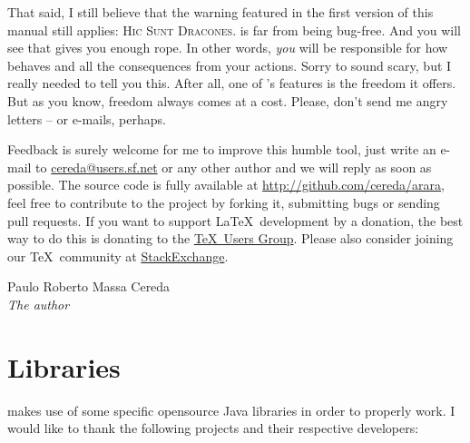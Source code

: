 \documentclass[a4paper,twoside,12pt]{memoir}
\begin{document}
That said, I still believe that the warning featured in the first version of this manual still applies: \textsc{Hic Sunt Dracones}. \arara is far from being bug-free. And you will see that \arara gives you enough rope. In other words, \emph{you} will be responsible for how \arara behaves and all the consequences from your actions. Sorry to sound scary, but I really needed to tell you this. After all, one of \arara's features is the freedom it offers. But as you know, freedom always comes at a cost. Please, don't send me angry letters -- or e-mails, perhaps.

Feedback is surely welcome for me to improve this humble tool, just write an 
e-mail to \url{cereda@users.sf.net} or any other author and we will reply as soon as possible. The source code is fully available at \url{http://github.com/cereda/arara}, feel free to contribute to the project by forking it, submitting bugs or sending pull requests. If you want to support \LaTeX\ development by a donation, the best way to do this is donating to the \href{http://www.tug.org/}{\TeX\ Users Group}. Please also  consider joining our \TeX\ community at \href{http://tex.stackexchange.com}{StackExchange}.

\vfill

\begin{flushright}
Paulo Roberto Massa Cereda\\
\emph{The author}
\end{flushright}

\cleardoublepage

\section*{Libraries}

\arara makes use of some specific opensource Java libraries in order to properly work. I would like to thank the following projects and their respective developers:
\end{document}
